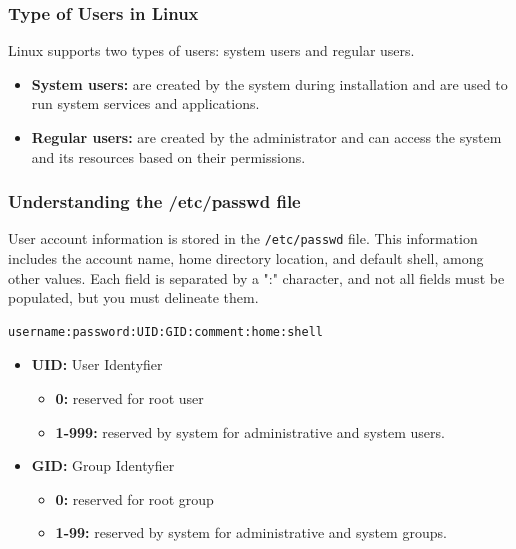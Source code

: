 \documentclass{article}
\newenvironment{codetemplate}[1][]{%
  \mybasecolorbox[#1]
  \itshape
}{%
  \endmybasecolorbox
}
\begin{document}
\subsubsection{Type of Users in Linux}
Linux supports two types of users: system users and regular users.

\begin{itemize}
    \item \textbf{System users:} are created by the system during installation and are used to run system services and applications.
    \item \textbf{Regular users:} are created by the administrator and can access the system and its resources based on their permissions.
\end{itemize}


\subsubsection{Understanding the /etc/passwd file}

User account information is stored in the \verb|/etc/passwd| file. This information includes the account name, home directory location, and default shell, among other values. Each field is separated by a ":" character, and not all fields must be populated, but you must delineate them.

\begin{codetemplate}{}
\begin{verbatim}
username:password:UID:GID:comment:home:shell
\end{verbatim}
\end{codetemplate}

\begin{itemize}
    \item \textbf{UID:} User Identyfier
    \begin{itemize}
        \item \textbf{0:} reserved for root user
        \item \textbf{1-999:} reserved by system for administrative and system users.
    \end{itemize}
    \item \textbf{GID:} Group Identyfier
    \begin{itemize}
        \item \textbf{0:} reserved for root group
        \item \textbf{1-99:} reserved by system for administrative and system groups.
    \end{itemize}
\end{itemize}
\end{document}

